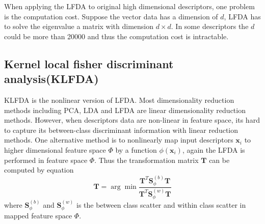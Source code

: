 When applying the LFDA to original high dimensional descriptors, one problem is the computation cost. Suppose the vector data has a dimension of $d$, LFDA has to solve the eigenvalue a matrix with dimension $d\times d$. In some descriptors the $d$ could be more than 20000 and thus the computation cost is intractable. 
 
\subsection{Kernel local fisher discriminant analysis(KLFDA)}

KLFDA  \cite{KLFDA} is the nonlinear version of LFDA. Most dimensionality reduction methods including PCA, LDA and LFDA are linear dimensionality reduction methods. However, when descriptors data are non-linear in feature space, its hard to capture its between-class discriminant information with linear reduction methods. One alternative method is to nonlinearly map input descriptors $\bm{x}_i$ to higher dimensional feature space $\Phi$ by a function $\phi(\bm{x}_i)$, again the LFDA is performed in feature space $\Phi$. Thus the transformation matrix $\bm{T}$ can be computed by equation
\begin{equation}
\bm{T} = \arg \min \frac{\bm{T}^T\bm{S}^{(b)}_{\phi}\bm{T}}{\bm{T}^T\bm{S}^{(w)}_{\phi}\bm{T}}
\end{equation}
where $\bm{S}^{(b)}_{\phi}$ and $\bm{S}^{(w)}_{\phi}$ is the between class scatter and within class scatter in mapped feature space $\Phi$.

